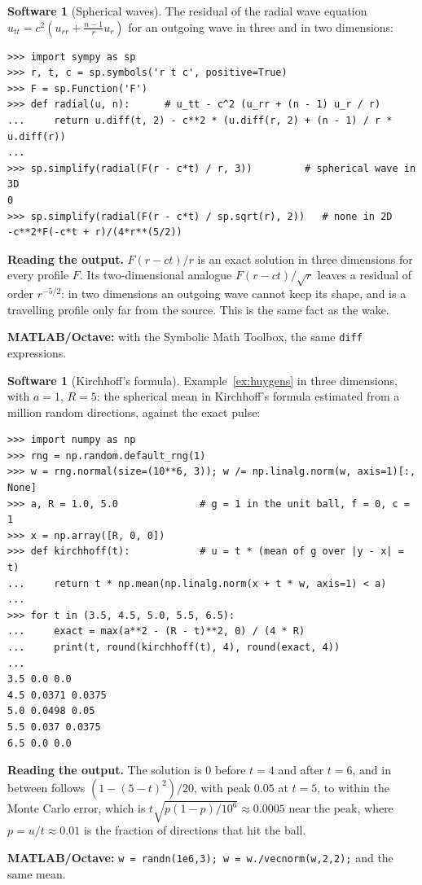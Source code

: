 \documentclass[11pt,a4paper]{article}
\numberwithin{equation}{section}
\theoremstyle{definition}
\newtheorem{software}[thm]{Software}
\begin{document}
\begin{software}[Spherical waves]
\label{sw:radial}
The residual of the radial wave equation $u_{tt} = c^2(u_{rr} + \frac{n - 1}ru_r)$ for an outgoing wave in three and in two dimensions:
{\small\begin{verbatim}
>>> import sympy as sp
>>> r, t, c = sp.symbols('r t c', positive=True)
>>> F = sp.Function('F')
>>> def radial(u, n):      # u_tt - c^2 (u_rr + (n - 1) u_r / r)
...     return u.diff(t, 2) - c**2 * (u.diff(r, 2) + (n - 1) / r * u.diff(r))
...
>>> sp.simplify(radial(F(r - c*t) / r, 3))         # spherical wave in 3D
0
>>> sp.simplify(radial(F(r - c*t) / sp.sqrt(r), 2))   # none in 2D
-c**2*F(-c*t + r)/(4*r**(5/2))
\end{verbatim}}
\textbf{Reading the output.} $F(r - ct)/r$ is an exact solution in three dimensions for every profile $F$. Its two-dimensional analogue $F(r - ct)/\sqrt r$ leaves a residual of order $r^{-5/2}$: in two dimensions an outgoing wave cannot keep its shape, and is a travelling profile only far from the source. This is the
same fact as the wake.

\textbf{MATLAB/Octave:} with the Symbolic Math Toolbox, the same \texttt{diff} expressions.
\end{software}

\begin{software}[Kirchhoff's formula]
\label{sw:kirchhoff}
Example~\ref{ex:huygens} in three dimensions, with $a = 1$, $R = 5$: the spherical mean in Kirchhoff's formula estimated from a million random directions, against the exact pulse:
{\small\begin{verbatim}
>>> import numpy as np
>>> rng = np.random.default_rng(1)
>>> w = rng.normal(size=(10**6, 3)); w /= np.linalg.norm(w, axis=1)[:, None]
>>> a, R = 1.0, 5.0              # g = 1 in the unit ball, f = 0, c = 1
>>> x = np.array([R, 0, 0])
>>> def kirchhoff(t):            # u = t * (mean of g over |y - x| = t)
...     return t * np.mean(np.linalg.norm(x + t * w, axis=1) < a)
...
>>> for t in (3.5, 4.5, 5.0, 5.5, 6.5):
...     exact = max(a**2 - (R - t)**2, 0) / (4 * R)
...     print(t, round(kirchhoff(t), 4), round(exact, 4))
...
3.5 0.0 0.0
4.5 0.0371 0.0375
5.0 0.0498 0.05
5.5 0.037 0.0375
6.5 0.0 0.0
\end{verbatim}}
\textbf{Reading the output.} The solution is $0$ before $t = 4$ and after $t = 6$, and in between follows $(1 - (5 - t)^2)/20$, with peak $0.05$ at $t = 5$, to within the Monte Carlo error, which is $t\sqrt{p(1 - p)/10^6} \approx 0.0005$ near the peak, where $p = u/t \approx 0.01$ is the fraction of directions that hit the ball.

\textbf{MATLAB/Octave:} \texttt{w = randn(1e6,3); w = w./vecnorm(w,2,2);} and the same mean.
\end{software}
\end{document}

